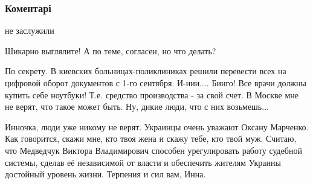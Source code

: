  
 
 
 
 
\subsubsection{Коментарі}
\label{sec:16_08_2021.fb.ivanochko_inna.1.era_digilitalizacia.cmt}

\begin{itemize}
 
не заслужили

 
Шикарно выглялите! А по теме, согласен, но что делать?

 

По секрету. В киевских больницах-поликлиниках решили перевести всех на цифровой
оборот документов с 1-го сентября. И-иии.... Бинго! Все врачи должны купить
себе ноутбуки! Т.е. средство производства - за свой счет. В Москве мне не
верят, что такое может быть. Ну, дикие люди, что с них возьмешь...


 

Инночка, люди уже никому не верят. Украинцы очень уважают Оксану Марченко. Как
говорится, скажи мне, кто твоя жена и скажу тебе, кто твой муж. Считаю, что
Медведчук Виктора Владимирович способен урегулировать работу судебной системы,
сделав её независимой от власти и обеспечить жителям Украины достойный уровень
жизни. Терпения и сил вам, Инна.


\end{itemize}

